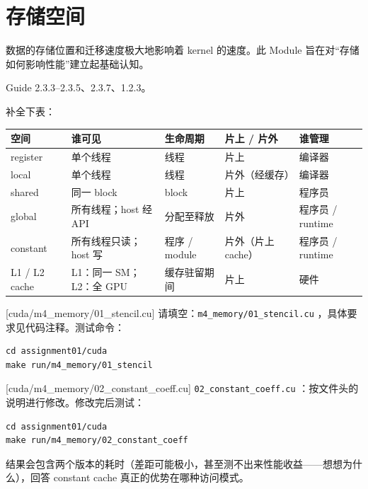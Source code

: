 \documentclass[11pt,a4paper,fontset=windows]{ctexart}
\begin{document}
\section{存储空间}

数据的存储位置和迁移速度极大地影响着 kernel 的速度。此 Module 旨在对“存储如何影响性能”建立起基础认知。

\begin{reading}
Guide 2.3.3--2.3.5、2.3.7、1.2.3。
\end{reading}

补全下表：

\begin{center}\small
\begin{tabular}{@{}lp{8em}p{7em}p{6em}p{8em}@{}}
\toprule
空间 & 谁可见 & 生命周期 & 片上 / 片外 & 谁管理 \\
\midrule
register & 单个线程 & 线程 & 片上 & 编译器 \\
local & 单个线程 & 线程 & 片外（经缓存） & 编译器 \\
shared & 同一 block & block & 片上 & 程序员 \\
global & 所有线程；host 经 API & 分配至释放 & 片外 & 程序员 / runtime \\
constant & 所有线程只读；host 写 & 程序 / module & 片外（片上 cache） & 程序员 / runtime \\
L1 / L2 cache & L1：同一 SM；L2：全 GPU & 缓存驻留期间 & 片上 & 硬件 \\
\bottomrule
\end{tabular}
\end{center}

[cuda/m4\_memory/01\_stencil.cu]
请填空：\texttt{m4\_memory/01\_stencil.cu} ，具体要求见代码注释。测试命令：

\begin{lstlisting}
cd assignment01/cuda
make run/m4_memory/01_stencil
\end{lstlisting}

[cuda/m4\_memory/02\_constant\_coeff.cu]
\texttt{02\_constant\_coeff.cu} ：按文件头的说明进行修改。修改完后测试：

\begin{lstlisting}
cd assignment01/cuda
make run/m4_memory/02_constant_coeff
\end{lstlisting}

结果会包含两个版本的耗时（差距可能极小，甚至测不出来性能收益——想想为什么），回答 constant cache 真正的优势在哪种访问模式。
\end{document}
